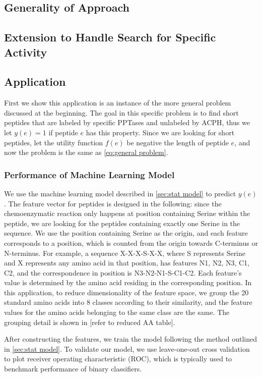 \documentclass[11pt]{article}
\begin{document}
\subsection{Generality of Approach} \label{sec:generality}

\subsection{Extension to Handle Search for Specific Activity} \label{sec:extension}

\subsection{Application} \label{sec:application}
First we show this application is an instance of the more general problem discussed
at the beginning. The goal in this specific problem is to find short peptides that 
are labeled by specific PPTases and unlabeled by ACPH, thus we let $y(e) = 1$
if peptide $e$ has this property. Since we are looking for short peptides, let the
utility function $f(e)$ be negative the length of peptide $e$, and now the problem
is the same as \eqref{eq:general problem}.

\subsubsection{Performance of Machine Learning Model}
We use the machine learning model described in \ref{sec:stat model} to predict $y(e)$.
The feature vector for peptides is designed in the following: since the chemoenzymatic
reaction only happens at position containing Serine within the peptide, we are looking 
for the peptides containing exactly one Serine in the sequence. We use the position 
containing Serine as the origin, and each feature corresponds to a position, which is
counted from the origin towards C-terminus or N-terminus. For example, a sequence
X-X-X-S-X-X, where S represents Serine and X represents any amino acid in that
position, has features N1, N2, N3, C1, C2, and the correspondence in position is
N3-N2-N1-S-C1-C2. Each feature's value is determined by the amino acid residing in
the corresponding position. In this application, to reduce dimensionality of the 
feature space, we group the 20 standard amino acids into 8 classes according to
their similarity, and the feature values for the amino acids belonging to the 
same class are the same. The grouping detail is shown in [refer to reduced AA table].

After constructing the features, we train the model following the method outlined
in \ref{sec:stat model}. To validate our model, we use leave-one-out 
cross validation to plot receiver operating characteristic (ROC), which
is typically used to benchmark performance of binary classifiers.
\end{document}
